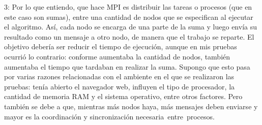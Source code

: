 \documentclass[12pt]{article}
\begin{document}
3: Por lo que entiendo, que hace MPI es distribuir las tareas o procesos (que en este caso son sumas), entre una cantidad de nodos que se especifican al ejecutar el algoritmo. Así, cada nodo se encarga de una parte de la suma y luego envía su resultado como un mensaje a otro nodo, de manera que el trabajo se reparte. El objetivo debería ser reducir el tiempo de ejecución, aunque en mis pruebas ocurrió lo contrario: conforme aumentaba la cantidad de nodos, también aumentaba el tiempo que tardaban en realizar la suma. Supongo que esto pasa por varias razones relacionadas con el ambiente en el que se realizaron las pruebas: tenía abierto el navegador web, influyen el tipo de procesador, la cantidad de memoria RAM y el sistema operativo, entre otros factores. Pero también se debe a que, mientras más nodos haya, más mensajes deben enviarse y mayor es la coordinación y sincronización necesaria entre procesos.
\end{document}
